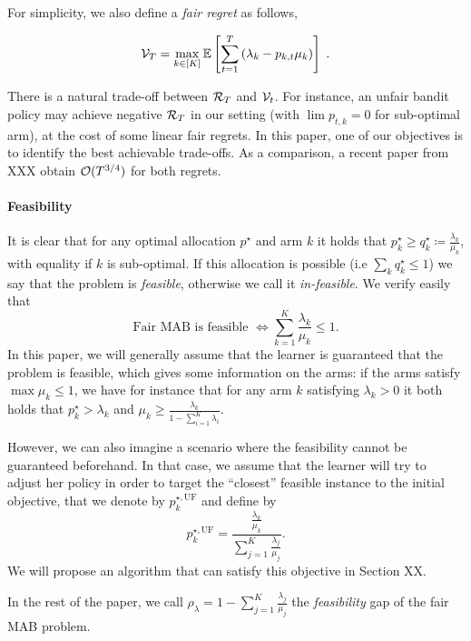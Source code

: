 For simplicity, we also define a \emph{fair regret} as follows, 

\[ \mathcal{V}_T = \max_{k \in [K]} \mathbb{E}\left[\sum_{t=1}^T \left(\lambda_k-p_{k,t} \mu_k \right)\right] \;. \]

There is a natural trade-off between $\mathcal{R}_T$ and $\mathcal{V}_t$. For instance, an unfair bandit policy may achieve negative $\mathcal{R}_T$ in our setting (with $\lim p_{t,k}=0$ for sub-optimal arm), at the cost of some linear fair regrets. In this paper, one of our objectives is to identify the best achievable trade-offs. As a comparison, a recent paper from XXX obtain $\mathcal{O}(T^{3/4})$ for both regrets.


\paragraph{Feasibility} It is clear that for any optimal allocation $p^\star$ and arm $k$ it holds that $p_k^\star\geq q_k^\star \coloneqq \frac{\lambda_k}{\mu_k}$, with equality if $k$ is sub-optimal. If this allocation is possible (i.e $\sum_k q_k^\star\leq 1$) we say that the problem is \emph{feasible}, otherwise we call it \emph{in-feasible}. We verify easily that 
\[\text{Fair MAB is feasible } \Longleftrightarrow \sum_{k=1}^K \frac{\lambda_k}{\mu_k}\leq 1. \]
In this paper, we will generally assume that the learner is guaranteed that the problem is feasible, which gives some information on the arms: if the arms satisfy $\max \mu_k \leq 1$, we have for instance that for any arm $k$ satisfying $\lambda_k>0$ it both holds that $p_k^\star>\lambda_k$ and $\mu_k \geq \frac{\lambda_k}{1-\sum_{i=1}^K \lambda_i}$. 

However, we can also imagine a scenario where the feasibility cannot be guaranteed beforehand. In that case, we assume that the learner will try to adjust her policy in order to target the ``closest'' feasible instance to the initial objective, that we denote by $p_k^{\star, \text{UF}}$ and define by  
\[p_k^{\star, \text{UF}}= \frac{\frac{\lambda_k}{\mu_k}}{\sum_{j=1}^K\frac{\lambda_j}{\mu_j}}.\]
We will propose an algorithm that can satisfy this objective in Section XX.

In the rest of the paper, we call $\rho_\lambda = 1-\sum_{j=1}^K\frac{\lambda_j}{\mu_j}$ the \emph{feasibility} gap of the fair MAB problem. 